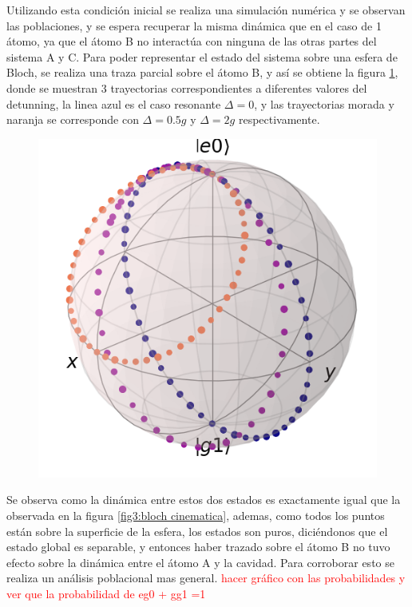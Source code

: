 Utilizando esta condición inicial se realiza una simulación numérica y se observan las poblaciones, y se espera recuperar la misma dinámica que en el caso de 1 átomo, ya que el átomo B no interactúa con ninguna de las otras partes del sistema A y C. Para poder representar el estado del sistema sobre una esfera de Bloch, se realiza una traza parcial sobre el átomo B, y así se obtiene la figura \ref{fig4:bloch delta}, donde se muestran 3 trayectorias correspondientes a diferentes valores del detunning, la linea azul es el caso resonante $\Delta=0$, y las trayectorias morada y naranja se corresponde con $\Delta=0.5g$ y $\Delta=2g$ respectivamente.
\begin{figure}[H]
    \begin{minipage}[c]{0.67\textwidth}
        \includegraphics[width=\textwidth]{figuras/ch4/bloch eg0 bloch AC a=0 d=2.0 x=0.0 k=0.0 J=0.0 gamma=0.0 p=0.0.png}
    \end{minipage}\hfill
    \begin{minipage}[c]{0.3\textwidth}
    \caption{
         } \label{fig4:bloch delta}
  \end{minipage}
\end{figure}
Se observa como la dinámica entre estos dos estados es exactamente igual que la observada en la figura \ref{fig3:bloch cinematica}, ademas, como todos los puntos están sobre la superficie de la esfera, los estados son puros, diciéndonos que el estado global es separable, y entonces haber trazado sobre el átomo B no tuvo efecto sobre la dinámica entre el átomo A y la cavidad. Para corroborar esto se realiza un análisis poblacional mas general. \textcolor{red}{hacer gráfico con las probabilidades y ver que la probabilidad de eg0 + gg1 =1}
